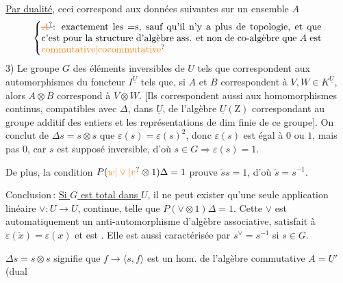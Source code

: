 \uline{Par dualité}, ceci correspond aux
données suivantes sur un ensemble $A$
\[
\left\{\vcenter{\hbox{\begin{minipage}{0.85\linewidth}
\deleted{\unsure{$A$}}: exactement les $=$s, sauf qu'il n'y a plus de topologie, et que c'est pour la structure d'algèbre ass. et non de co-algèbre que $A$ est \unsure{commutative|cocommutative}
\end{minipage}}}\right.
\]
3) Le groupe $G$ des éléments inversibles de $U$
tels que    correspondent aux
automorphismes du foncteur $I^{\underline U}$ tels que,
si $A$ et $B$  correspondent à $V,W\in K^{\underline U}$,
alors $A\otimes B$ correspond à $V\otimes W$. [Ils
correspondent aussi aux homomorphismes
 continus, compatibles avec $\Delta$,
dans $\underline U$, de l'algèbre $\underline U(\mathrm Z)$ correspondant
au groupe additif des entiers et les
représentations  de dim finie
de ce groupe]. On conclut de
$\Delta s=s\otimes s$ que $\varepsilon(s)=\varepsilon(s)^2$, donc $\varepsilon(s)$ est égal
à $0$ ou $1$, mais pas $0$, car $s$ est supposé
inversible, d'où \uline{$s\in G\Longrightarrow\varepsilon(s)=1$}.

De plus, la  condition $P(\unsure{w|\vee|v}\otimes1)\Delta=1$
prouve $\breve s s=1$, d'où \uline{$\breve s=s^{-1}$}.

Conclusion\,: \uline{Si $G$ est total dans $U$}, il
ne peut exister qu'une seule application
 linéaire $\vee:U\longrightarrow U$, continue,
telle que $P(\vee\otimes1)\Delta=1$. Cette $\vee$ est
automatiquement un anti-automorphisme
d'algèbre associative, satisfait à $\varepsilon(\breve x)=\varepsilon(x)$
et est .
Elle est aussi caractérisée par $s^\vee=s^{-1}$
si $s\in G$. 

$\Delta s=s\otimes s$ signifie que $f\longrightarrow\langle s,f\rangle$
 est un hom. de l'algèbre
commutative $A=\underline U'$ (dual

